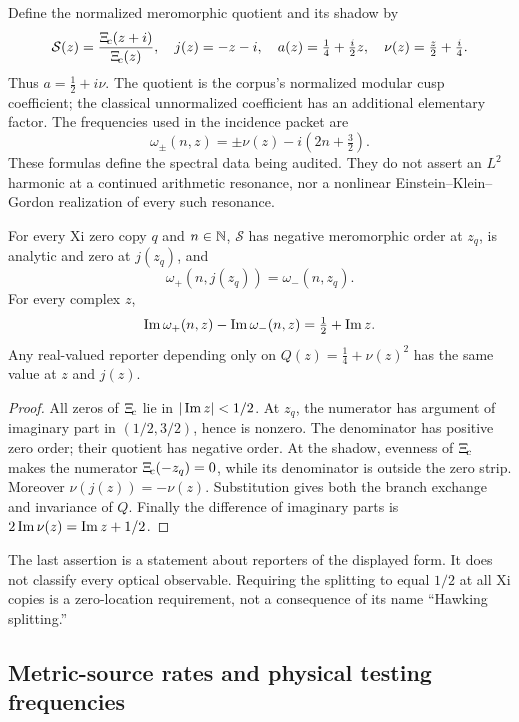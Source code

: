 Define the normalized meromorphic quotient and its shadow by
\[
 \mathcal S(z)=\frac{\Xi_{\!c}(z+i)}{\Xi_{\!c}(z)},\quad
 j(z)=-z-i,\quad a(z)=\tfrac14+\tfrac i2z,\quad
 \nu(z)=\tfrac z2+\tfrac i4.
\]
Thus \(a=\tfrac12+i\nu\). The quotient is the corpus's normalized modular cusp coefficient; the classical unnormalized coefficient has an additional elementary factor. The frequencies used in the incidence packet are
\[
 \omega_\pm(n,z)=\pm\nu(z)-i(2n+\tfrac32).
\]
These formulas define the spectral data being audited. They do not assert an \(L^2\) harmonic at a continued arithmetic resonance, nor a nonlinear Einstein--Klein--Gordon realization of every such resonance.

\begin{proposition}\label{thm:incidence}
For every Xi zero copy \(q\) and \(n\in\mathbb N\), \(\mathcal S\) has negative meromorphic order at \(z_q\), is analytic and zero at \(j(z_q)\), and
\[
 \omega_+(n,j(z_q))=\omega_-(n,z_q).
\]
For every complex \(z\),
\[
 \operatorname{Im}\omega_+(n,z)-\operatorname{Im}\omega_-(n,z)=\tfrac12+\operatorname{Im} z.
\]
Any real-valued reporter depending only on \(Q(z)=\tfrac14+\nu(z)^2\) has the same value at \(z\) and \(j(z)\).
\end{proposition}
\begin{proof}
All zeros of \(\Xi_{\!c}\) lie in \(|\operatorname{Im} z|<1/2\). At \(z_q\), the numerator has argument of imaginary part in \((1/2,3/2)\), hence is nonzero. The denominator has positive zero order; their quotient has negative order. At the shadow, evenness of \(\Xi_{\!c}\) makes the numerator \(\Xi_{\!c}(-z_q)=0\), while its denominator is outside the zero strip. Moreover \(\nu(j(z))=-\nu(z)\). Substitution gives both the branch exchange and invariance of \(Q\). Finally the difference of imaginary parts is \(2\operatorname{Im}\nu(z)=\operatorname{Im} z+1/2\).
\end{proof}

The last assertion is a statement about reporters of the displayed form. It does not classify every optical observable. Requiring the splitting to equal \(1/2\) at all Xi copies is a zero-location requirement, not a consequence of its name ``Hawking splitting.''

\subsection{Metric-source rates and physical testing frequencies}


